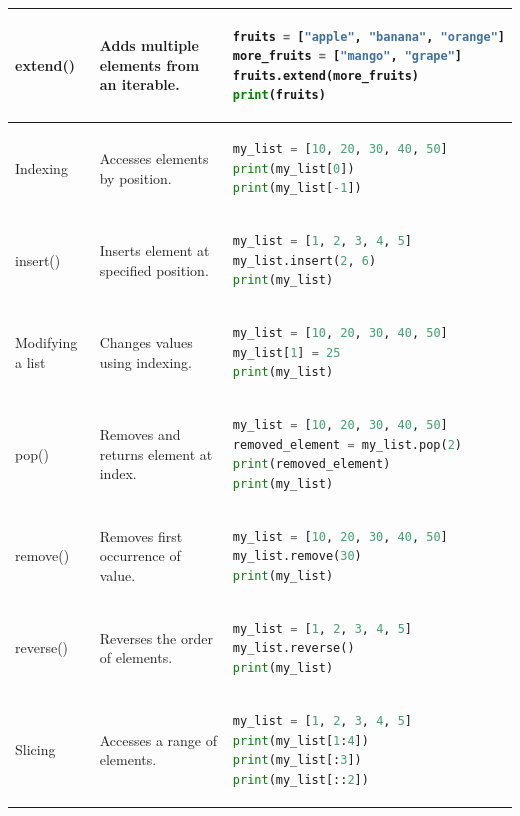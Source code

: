 \documentclass[../../data_analysis_python.tex]{subfiles}
\begin{document}
\begin{longtable}{p{} p{} p{}}
    extend() & Adds multiple elements from an iterable. & 
    \begin{lstlisting}[language=Python]
fruits = ["apple", "banana", "orange"]
more_fruits = ["mango", "grape"]
fruits.extend(more_fruits)
print(fruits)
    \end{lstlisting} \\
    \hline
    
    Indexing & Accesses elements by position. & 
    \begin{lstlisting}[language=Python]
my_list = [10, 20, 30, 40, 50]
print(my_list[0])
print(my_list[-1])
    \end{lstlisting} \\
    \hline
    
    insert() & Inserts element at specified position. & 
    \begin{lstlisting}[language=Python]
my_list = [1, 2, 3, 4, 5]
my_list.insert(2, 6)
print(my_list)
    \end{lstlisting} \\
    \hline
    
    Modifying a list & Changes values using indexing. & 
    \begin{lstlisting}[language=Python]
my_list = [10, 20, 30, 40, 50]
my_list[1] = 25
print(my_list)
    \end{lstlisting} \\
    \hline
    
    pop() & Removes and returns element at index. & 
    \begin{lstlisting}[language=Python]
my_list = [10, 20, 30, 40, 50]
removed_element = my_list.pop(2)
print(removed_element)
print(my_list)
    \end{lstlisting} \\
    \hline
    
    remove() & Removes first occurrence of value. & 
    \begin{lstlisting}[language=Python]
my_list = [10, 20, 30, 40, 50]
my_list.remove(30)
print(my_list)
    \end{lstlisting} \\
    \hline
    
    reverse() & Reverses the order of elements. & 
    \begin{lstlisting}[language=Python]
my_list = [1, 2, 3, 4, 5]
my_list.reverse()
print(my_list)
    \end{lstlisting} \\
    \hline
    
    Slicing & Accesses a range of elements. & 
    \begin{lstlisting}[language=Python]
my_list = [1, 2, 3, 4, 5]
print(my_list[1:4])
print(my_list[:3])
print(my_list[::2])
    \end{lstlisting} \\
    \hline
    

\end{longtable}
\end{document}
